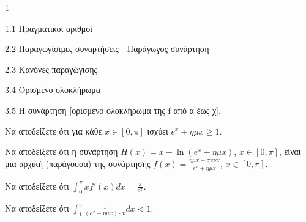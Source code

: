 \begin{ylh}{1}
    \item 1.1 Πραγματικοί αριθμοί
    \item 2.2 Παραγωγίσιμες συναρτήσεις - Παράγωγος συνάρτηση
    \item 2.3 Κανόνες παραγώγισης
    \item 3.4 Ορισμένο ολοκλήρωμα
    \item 3.5 Η συνάρτηση [ορισμένο ολοκλήρωμα της f από α έως χ].
\end{ylh}
\begin{alist}
\item Να αποδείξετε ότι για κάθε $x \in [0, \pi]$ ισχύει $e^x + \eta\mu x \ge 1$. 
\item Να αποδείξετε ότι η συνάρτηση $H(x) = x - \ln(e^x + \eta\mu x)$, $x \in [0, \pi]$, είναι μια αρχική (παράγουσα) της συνάρτησης $f(x) = \frac{\eta\mu x - \sigma\upsilon\nu x}{e^x + \eta\mu x}$, $x \in [0, \pi]$. 
\item Να αποδείξετε ότι $\int_0^\pi xf'(x)dx = \frac{\pi}{e^\pi}$. 
\item Να αποδείξετε ότι $\int_1^e \frac{1}{(e^x+\eta\mu x)\cdot x} dx < 1$. 
\end{alist}